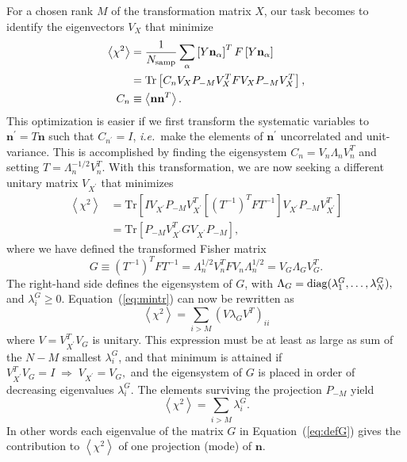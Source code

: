 \documentclass[onecolumn,resetfootnote]{aastex7}
\newcommand{\ie}{\textit{i.e.}}
\newcommand{\eqq}[1]{Equation~(\ref{#1})}
\newcommand{\vecn}{\ensuremath{\mathbf{n}}}
\newcommand{\covm}{C}
\newcommand{\matF}{F}
\newcommand{\matG}{G}
\newcommand{\matI}{I}
\newcommand{\matT}{T}
\newcommand{\matY}{Y}
\newcommand{\matV}{V}
\newcommand{\matLam}{\Lambda}
\newcommand{\proj}{P}  %
\newcommand{\trace}{\text{Tr}}
\begin{document}
For a chosen rank $M$ of the
transformation matrix $X$, our task becomes to identify the
eigenvectors $V_X$ that minimize
\begin{align}
  \left\langle \chi^2\right\rangle & = \frac{1}{N_{\rm samp}} \sum_\alpha
  \left[ \matY \vecn_\alpha\right]^T \matF  \left[\matY
                                     \vecn_\alpha\right] \\
       & = \trace \left[ \covm_n V_X \proj_{-M} V_X^T \matF V_X
         \proj_{-M} V_X^T \right], \\
  C_n & \equiv \left\langle \vecn \vecn^T \right\rangle.
\end{align}
This optimization is easier if we first transform the systematic variables to
$\vecn^\prime =\matT\vecn$ such that $\covm_{n^\prime}=\matI$, \ie\
make the elements of $\vecn^\prime$ uncorrelated and unit-variance.  This
is accomplished by finding the eigensystem $\covm_n=\matV_n \matLam_n
\matV_n^T$ and setting $\matT = \matLam_n^{-1/2} \matV_n^T$.  With
this transformation, we are now seeking a different unitary matrix
$\matV_{X^\prime}$ that minimizes
\begin{align}
  \left\langle \chi^2\right\rangle & = \trace \left[ \matI
    V_{X^\prime} \proj_{-M} V_{X^\prime}^T \left[ (T^{-1})^T \matF
      T^{-1} \right] V_{X^\prime} 
    \proj_{-M} V_{X^\prime}^T \right] \\
  & = \trace \left[ \proj_{-M} V_{X^\prime}^T \matG 
    V_{X^\prime} \proj_{-M} \right],
  \label{eq:mintr}
\end{align}
where we have defined the transformed Fisher matrix
\begin{equation}
  \matG \equiv \left(T^{-1}\right)^T \matF   T^{-1} = \matLam_n^{1/2} \matV_n^T
  \matF \matV_n \matLam_n^{1/2} = \matV_G \matLam_G \matV_G^T.
  \label{eq:defG}
\end{equation}
The right-hand side defines the eigensystem of $G$, with $\Lambda_G={\rm diag}(\lambda^G_1,\ldots,\lambda^G_N),$ and $\lambda^G_i\ge0.$  \eqq{eq:mintr} can now be rewritten as
\begin{equation}
\left\langle \chi^2\right\rangle = \sum_{i>M} \left(\matV\lambda_G \matV^T\right)_{ii}
\end{equation}
where $\matV=\matV^T_{X^\prime}\matV_G$ is unitary.  This expression must be at least as large as sum of the $N-M$ smallest $\lambda^G_i$, and that minimum is attained if
$\matV_{X^\prime}^T \matV_G = \matI \; \Rightarrow \; \matV_{X^\prime} = \matV_G,$ and the eigensystem of $G$ is placed
in order of decreasing eigenvalues $\lambda^G_i.$ The
elements surviving the projection $P_{-M}$ yield
\begin{equation}
  \left\langle \chi^2\right\rangle = \sum_{i>M} \lambda_i^G.
  \label{eq:chiresid}
\end{equation}
In other words each eigenvalue of the matrix $\matG$ in \eqq{eq:defG}
gives the contribution to $\left\langle\chi^2\right\rangle$ of one
projection (mode) of $\vecn.$
\end{document}
